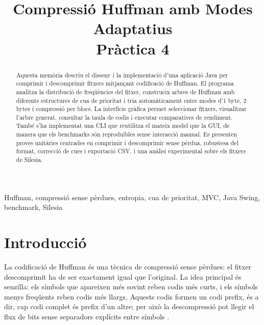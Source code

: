 \documentclass[conference,compsoc]{IEEEtran}
\begin{document}
\title{Compressió Huffman amb Modes Adaptatius\\ Pràctica 4}

\author{
}

\maketitle

\begin{strip}
\begin{abstract}
Aquesta memòria descriu el disseny i la implementació d'una aplicació Java
per comprimir i descomprimir fitxers mitjançant codificació de Huffman.
El programa analitza la distribució de freqüències del fitxer, construeix
arbres de Huffman amb diferents estructures de cua de prioritat i tria
automàticament entre modes d'1 byte, 2 bytes i compressió per blocs. La
interfície gràfica permet seleccionar fitxers, visualitzar l'arbre generat,
consultar la taula de codis i executar comparatives de rendiment. També
s'ha implementat una CLI que reutilitza el mateix model que la GUI, de
manera que els benchmarks són reproduïbles sense interacció manual. Es
presenten proves unitàries centrades en comprimir i descomprimir sense pèrdua,
robustesa del format,
correcció de cues i exportació CSV, i una anàlisi
experimental sobre els fitxers de Silesia.
\end{abstract}

\begin{IEEEkeywords}
Huffman, compressió sense pèrdues, entropia, cua de prioritat, MVC,
Java Swing, benchmark, Silesia
\end{IEEEkeywords}
\end{strip}

\IEEEpeerreviewmaketitle

\section{Introducció}

La codificació de Huffman és una tècnica de compressió sense pèrdues:
el fitxer descomprimit ha de ser exactament igual que l'original. La idea
principal és senzilla: els símbols que apareixen més sovint reben codis
més curts, i els símbols menys freqüents reben codis més llargs. Aquests
codis formen un codi prefix, és a dir, cap codi complet és prefix d'un
altre; per això la descompressió pot llegir el flux de bits sense
separadors explícits entre símbols \cite{ref_gfg_huffman}.
\end{document}
